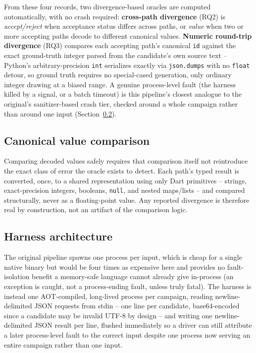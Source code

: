 From these four records, two divergence-based oracles are computed
automatically, with no crash required: \textbf{cross-path divergence}
(RQ2) is \emph{accept/reject} when acceptance status differs across paths,
or \emph{value} when two or more accepting paths decode to different
canonical values. \textbf{Numeric round-trip divergence} (RQ3) compares each
accepting path's canonical \texttt{id} against the exact ground-truth
integer parsed from the candidate's own source text -- Python's arbitrary-precision
\texttt{int} serializes exactly via \texttt{json.dumps} with no
\texttt{float} detour, so ground truth requires no special-cased generation,
only ordinary integer drawing at a biased range. A genuine process-level
fault (the harness killed by a signal, or a batch timeout) is this
pipeline's closest analogue to the original's sanitizer-based crash tier,
checked around a whole campaign rather than around one input
(Section~\ref{sec:harness-arch}).

\subsection{Canonical value comparison}
\label{sec:canonical}
Comparing decoded values safely requires that comparison itself not
reintroduce the exact class of error the oracle exists to detect. Each
path's typed result is converted, once, to a shared representation using
only Dart primitives -- strings, exact-precision integers, booleans,
\texttt{null}, and nested maps/lists -- and compared structurally, never as
a floating-point value. Any reported divergence is therefore real by
construction, not an artifact of the comparison logic.

\subsection{Harness architecture}
\label{sec:harness-arch}
The original pipeline spawns one process per input, which is cheap for a
single native binary but would be four times as expensive here and
provides no fault-isolation benefit a memory-safe language cannot already
give in-process (an exception is caught, not a process-ending fault, unless
truly fatal). The harness is instead one AOT-compiled, long-lived process
per campaign, reading newline-delimited JSON requests from stdin -- one
line per candidate, base64-encoded since a candidate may be invalid UTF-8 by
design -- and writing one newline-delimited JSON result per line, flushed
immediately so a driver can still attribute a later process-level fault to
the correct input despite one process now serving an entire campaign rather
than one input.

